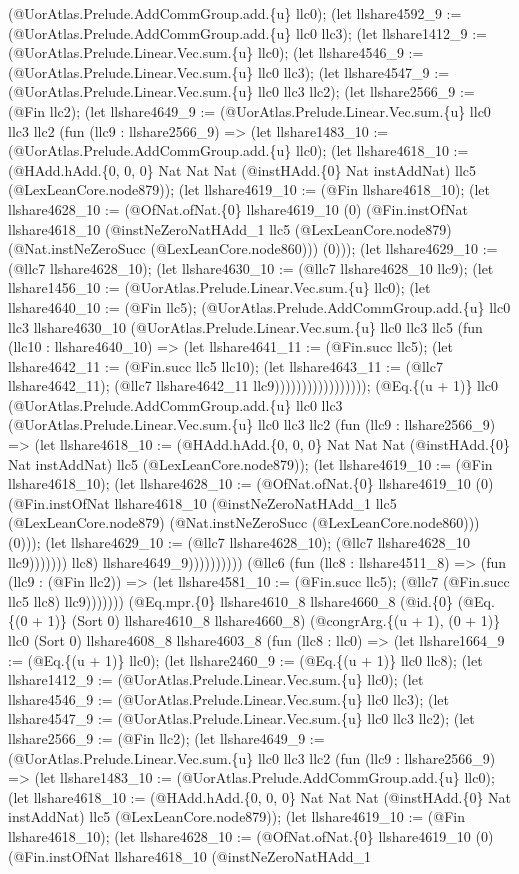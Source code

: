 \documentclass[11pt]{article}
\begin{document}
(@UorAtlas.Prelude.AddCommGroup.add.\{u\} llc0); (let llshare4592\_9 := (@UorAtlas.Prelude.AddCommGroup.add.\{u\} llc0 llc3); (let llshare1412\_9 := (@UorAtlas.Prelude.Linear.Vec.sum.\{u\} llc0); (let llshare4546\_9 := (@UorAtlas.Prelude.Linear.Vec.sum.\{u\} llc0 llc3); (let llshare4547\_9 := (@UorAtlas.Prelude.Linear.Vec.sum.\{u\} llc0 llc3 llc2); (let llshare2566\_9 := (@Fin llc2); (let llshare4649\_9 := (@UorAtlas.Prelude.Linear.Vec.sum.\{u\} llc0 llc3 llc2 (fun (llc9 : llshare2566\_9) => (let llshare1483\_10 := (@UorAtlas.Prelude.AddCommGroup.add.\{u\} llc0); (let llshare4618\_10 := (@HAdd.hAdd.\{0, 0, 0\} Nat Nat Nat (@instHAdd.\{0\} Nat instAddNat) llc5 (@LexLeanCore.node879)); (let llshare4619\_10 := (@Fin llshare4618\_10); (let llshare4628\_10 := (@OfNat.ofNat.\{0\} llshare4619\_10 (0) (@Fin.instOfNat llshare4618\_10 (@instNeZeroNatHAdd\_1 llc5 (@LexLeanCore.node879) (@Nat.instNeZeroSucc (@LexLeanCore.node860))) (0))); (let llshare4629\_10 := (@llc7 llshare4628\_10); (let llshare4630\_10 := (@llc7 llshare4628\_10 llc9); (let llshare1456\_10 := (@UorAtlas.Prelude.Linear.Vec.sum.\{u\} llc0); (let llshare4640\_10 := (@Fin llc5); (@UorAtlas.Prelude.AddCommGroup.add.\{u\} llc0 llc3 llshare4630\_10 (@UorAtlas.Prelude.Linear.Vec.sum.\{u\} llc0 llc3 llc5 (fun (llc10 : llshare4640\_10) => (let llshare4641\_11 := (@Fin.succ llc5); (let llshare4642\_11 := (@Fin.succ llc5 llc10); (let llshare4643\_11 := (@llc7 llshare4642\_11); (@llc7 llshare4642\_11 llc9))))))))))))))))); (@Eq.\{(u + 1)\} llc0 (@UorAtlas.Prelude.AddCommGroup.add.\{u\} llc0 llc3 (@UorAtlas.Prelude.Linear.Vec.sum.\{u\} llc0 llc3 llc2 (fun (llc9 : llshare2566\_9) => (let llshare4618\_10 := (@HAdd.hAdd.\{0, 0, 0\} Nat Nat Nat (@instHAdd.\{0\} Nat instAddNat) llc5 (@LexLeanCore.node879)); (let llshare4619\_10 := (@Fin llshare4618\_10); (let llshare4628\_10 := (@OfNat.ofNat.\{0\} llshare4619\_10 (0) (@Fin.instOfNat llshare4618\_10 (@instNeZeroNatHAdd\_1 llc5 (@LexLeanCore.node879) (@Nat.instNeZeroSucc (@LexLeanCore.node860))) (0))); (let llshare4629\_10 := (@llc7 llshare4628\_10); (@llc7 llshare4628\_10 llc9))))))) llc8) llshare4649\_9)))))))))) (@llc6 (fun (llc8 : llshare4511\_8) => (fun (llc9 : (@Fin llc2)) => (let llshare4581\_10 := (@Fin.succ llc5); (@llc7 (@Fin.succ llc5 llc8) llc9))))))) (@Eq.mpr.\{0\} llshare4610\_8 llshare4660\_8 (@id.\{0\} (@Eq.\{(0 + 1)\} (Sort 0) llshare4610\_8 llshare4660\_8) (@congrArg.\{(u + 1), (0 + 1)\} llc0 (Sort 0) llshare4608\_8 llshare4603\_8 (fun (llc8 : llc0) => (let llshare1664\_9 := (@Eq.\{(u + 1)\} llc0); (let llshare2460\_9 := (@Eq.\{(u + 1)\} llc0 llc8); (let llshare1412\_9 := (@UorAtlas.Prelude.Linear.Vec.sum.\{u\} llc0); (let llshare4546\_9 := (@UorAtlas.Prelude.Linear.Vec.sum.\{u\} llc0 llc3); (let llshare4547\_9 := (@UorAtlas.Prelude.Linear.Vec.sum.\{u\} llc0 llc3 llc2); (let llshare2566\_9 := (@Fin llc2); (let llshare4649\_9 := (@UorAtlas.Prelude.Linear.Vec.sum.\{u\} llc0 llc3 llc2 (fun (llc9 : llshare2566\_9) => (let llshare1483\_10 := (@UorAtlas.Prelude.AddCommGroup.add.\{u\} llc0); (let llshare4618\_10 := (@HAdd.hAdd.\{0, 0, 0\} Nat Nat Nat (@instHAdd.\{0\} Nat instAddNat) llc5 (@LexLeanCore.node879)); (let llshare4619\_10 := (@Fin llshare4618\_10); (let llshare4628\_10 := (@OfNat.ofNat.\{0\} llshare4619\_10 (0) (@Fin.instOfNat llshare4618\_10 (@instNeZeroNatHAdd\_1 
\end{document}
